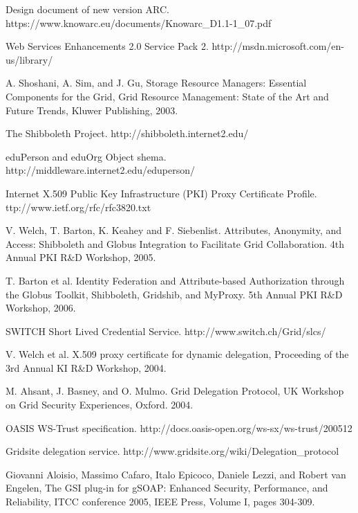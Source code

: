 \documentclass[twocolumn]{svjour3}         %
\begin{document}
\begin{thebibliography}{}
Design document of new version ARC. https://www.knowarc.eu/documents/Knowarc\_D1.1-1\_07.pdf

Web Services Enhancements 2.0 Service Pack 2. http://msdn.microsoft.com/en-us/library/

A. Shoshani, A. Sim, and J. Gu, Storage Resource Managers: Essential Components for the Grid, Grid Resource Management: State of the Art and Future Trends, Kluwer Publishing, 2003.

The Shibboleth Project. http://shibboleth.internet2.edu/

eduPerson and eduOrg Object shema. http://middleware.internet2.edu/eduperson/

Internet X.509 Public Key Infrastructure (PKI) Proxy Certificate Profile. ttp://www.ietf.org/rfc/rfc3820.txt

V. Welch, T. Barton, K. Keahey and F. Siebenlist. Attributes, Anonymity, and Access: Shibboleth and Globus Integration to Facilitate Grid Collaboration. 4th Annual PKI R\&D Workshop, 2005.

T. Barton et al. Identity Federation and Attribute-based Authorization through the Globus Toolkit, Shibboleth, Gridshib, and MyProxy. 5th Annual PKI R\&D Workshop, 2006.

SWITCH Short Lived Credential Service. http://www.switch.ch/Grid/slcs/

V. Welch et al. X.509 proxy certificate for dynamic delegation, Proceeding of the 3rd Annual KI R\&D Workshop, 2004.

M. Ahsant, J. Basney, and O. Mulmo. Grid Delegation Protocol, UK Workshop on Grid Security Experiences, Oxford. 2004.

OASIS WS-Trust specification. http://docs.oasis-open.org/ws-sx/ws-trust/200512

Gridsite delegation service. http://www.gridsite.org/wiki/Delegation\_protocol

Giovanni Aloisio, Massimo Cafaro, Italo Epicoco, Daniele Lezzi, and Robert van Engelen, The GSI plug-in for gSOAP: Enhanced Security, Performance, and Reliability, ITCC conference 2005, IEEE Press, Volume I, pages 304-309.

\end{thebibliography}
\end{document}
